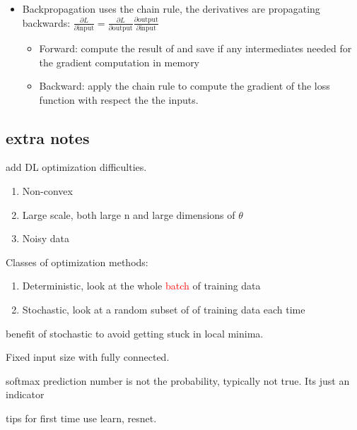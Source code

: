 \begin{itemize}
	\item Backpropagation uses the chain rule, the derivatives are propagating backwards: $\frac{\partial L} {\partial \text{input}} = \frac{\partial L} {\partial \text{output}} \frac{\partial \text{output}} {\partial \text{input}}   $
	\begin{itemize}
		\item Forward: compute the result of and save if any intermediates needed for the gradient computation in memory
		\item Backward: apply the chain rule to compute the gradient of the loss function with respect the the inputs.
	\end{itemize}
\end{itemize}



\subsection*{extra notes}

add  DL optimization difficulties. 
\begin{enumerate}
	\item Non-convex
	\item Large scale, both large n and large dimensions of $\theta$
	\item Noisy data
\end{enumerate}

Classes of optimization methods:

\begin{enumerate}
	\item Deterministic, look at the whole \textcolor{red}{batch} of training data
	\item Stochastic, look at a random subset of of training data each time 
\end{enumerate}


benefit of stochastic to avoid getting stuck in local minima. 

Fixed input size with fully connected. 

softmax prediction number is not the probability, typically not true. Its just an indicator 

tips for first time use learn, resnet. 